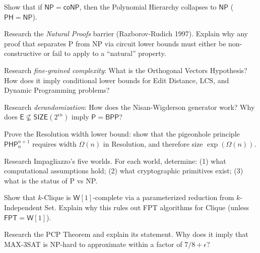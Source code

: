 \begin{exercise}[Intermediate]
Show that if $\mathsf{NP} = \mathsf{coNP}$, then the Polynomial Hierarchy collapses to $\mathsf{NP}$ ($\mathsf{PH} = \mathsf{NP}$).
\end{exercise}

\begin{exercise}[Challenge]
Research the \emph{Natural Proofs} barrier (Razborov-Rudich 1997). Explain why any proof that separates P from NP via circuit lower bounds must either be non-constructive or fail to apply to a ``natural'' property.
\end{exercise}

\begin{exercise}[Challenge]
Research \emph{fine-grained complexity}: What is the Orthogonal Vectors Hypothesis? How does it imply conditional lower bounds for Edit Distance, LCS, and Dynamic Programming problems?
\end{exercise}

\begin{exercise}[Challenge]
Research \emph{derandomization}: How does the Nisan-Wigderson generator work? Why does $\mathsf{E} \not\subseteq \mathsf{SIZE}(2^{\epsilon n})$ imply $\mathsf{P} = \mathsf{BPP}$?
\end{exercise}

\begin{exercise}[Challenge]
Prove the Resolution width lower bound: show that the pigeonhole principle $\mathsf{PHP}_n^{n+1}$ requires width $\Omega(n)$ in Resolution, and therefore size $\exp(\Omega(n))$.
\end{exercise}

\begin{exercise}[Challenge]
Research Impagliazzo's five worlds. For each world, determine: (1) what computational assumptions hold; (2) what cryptographic primitives exist; (3) what is the status of P vs NP.
\end{exercise}

\begin{exercise}[Challenge]
Show that $k$-Clique is $\mathsf{W}[1]$-complete via a parameterized reduction from $k$-Independent Set. Explain why this rules out FPT algorithms for Clique (unless $\mathsf{FPT} = \mathsf{W}[1]$).
\end{exercise}

\begin{exercise}[Challenge]
Research the PCP Theorem and explain its statement. Why does it imply that MAX-3SAT is NP-hard to approximate within a factor of $7/8 + \epsilon$?
\end{exercise}


